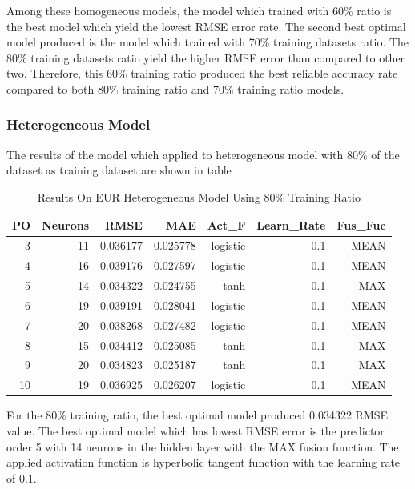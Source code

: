 {{{{{{{{{{{{Among these homogeneous models, the model which trained with 60\% ratio is the best model which yield the lowest RMSE error rate. The second best optimal model produced is the model which trained with 70\% training datasets ratio. The 80\% training datasets ratio yield the higher RMSE error than compared to other two. Therefore, this 60\% training ratio produced the best reliable accuracy rate compared to both  80\% training ratio  and 70\% training ratio models.

\subsubsection{Heterogeneous Model}

The results of the model which applied to heterogeneous model with 80\% of the dataset as training dataset are shown in table

\setlength{\tabcolsep}{0.5em} %
{\renewcommand{\arraystretch}{1.2}
	\begin{table}[ht]
		
		\begin{tabular}{@{}rrrrrrr@{}}
			\toprule
			\textbf{PO}&\textbf{Neurons}& \textbf{RMSE} & \textbf{MAE} & \textbf{Act\_F} & \textbf{Learn\_Rate}&\textbf{ Fus\_Fuc} \\ 
			\midrule
			 3 & 11 & 0.036177 & 0.025778 & logistic & 0.1 & MEAN \\ 
			 4 & 16 & 0.039176 & 0.027597 & logistic & 0.1 & MEAN \\ 
			 5 & 14 & 0.034322 & 0.024755 & tanh & 0.1 & MAX \\ 
			 6 & 19 & 0.039191 & 0.028041 & logistic & 0.1 & MEAN \\ 
			 7 & 20 & 0.038268 & 0.027482 & logistic & 0.1 & MEAN \\ 
			 8 & 15 & 0.034412 & 0.025085 & tanh & 0.1 & MAX \\ 
			 9 & 20 & 0.034823 & 0.025187 & tanh & 0.1 & MAX \\ 
			 10 & 19 & 0.036925 & 0.026207 & logistic & 0.1 & MEAN \\  
			\hline
		\end{tabular}
		\hspace*{1cm}
		\caption{Results On EUR Heterogeneous Model Using 80\% Training Ratio }
	\end{table}	
	
For the 80\% training ratio, the best optimal model  produced 0.034322 RMSE value. The best optimal model which has lowest RMSE error is the predictor order 5 with 14 neurons in the hidden layer with the MAX fusion function. The applied activation function is hyperbolic tangent function with the learning rate of 0.1.
	
}}}}}}}}}}}}}
